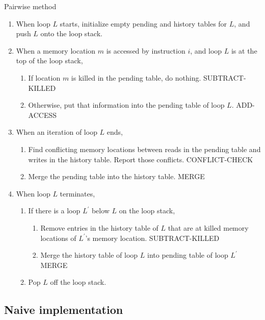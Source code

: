\documentclass[12pt,twoside]{reedthesis}
\begin{document}
		\begin{algorithm}
			\caption{Pairwise method}\label{basic-pariwise}
			\begin{enumerate}
				\item When loop $L$ starts, initialize empty pending and history tables for $L$, and push $L$ onto the loop stack.
				
				\item When a memory location $m$ is accessed by instruction $i$, and loop $L$ is at the top of the loop stack,
					\begin{enumerate}
						\item If location $m$ is killed in the pending table, do nothing. SUBTRACT-KILLED
						\item Otherwise, put that information into the pending table of loop $L$. ADD-ACCESS
					\end{enumerate} 
				
				\item When an iteration of loop $L$ ends,
					\begin{enumerate}
						\item Find conflicting memory locations between reads in the pending table and writes in the history table. Report those conflicts. CONFLICT-CHECK
						\item Merge the pending table into the history table. MERGE
					\end{enumerate} 
				
				\item When loop $L$ terminates, 
					\begin{enumerate}
						\item If there is a loop $L^\prime$ below $L$ on the loop stack,
						\begin{enumerate}
							\item Remove entries in the history table of $L$ that are at killed memory locations of $L^\prime$'s memory location. SUBTRACT-KILLED
							\item Merge the history table of loop $L$ into pending table of loop $L^\prime$ MERGE
						\end{enumerate} 
						\item Pop $L$ off the loop stack.
					\end{enumerate} 
				
			\end{enumerate}
		\end{algorithm}
	
	
		\subsection{Naive implementation}
		
\end{document}
